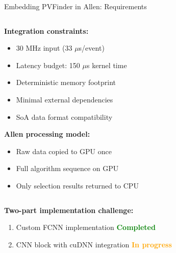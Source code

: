 \documentclass[10pt,aspectratio=169]{beamer}
\begin{document}
\begin{frame}{Embedding PVFinder in Allen: Requirements}
  \begin{columns}[T]
    \begin{column}{0.58\textwidth}
      \textbf{Integration constraints:}
      \begin{itemize}
        \item 30 MHz input (33 $\mu$s/event)
        \item Latency budget: 150 $\mu$s kernel time
        \item Deterministic memory footprint
        \item Minimal external dependencies
        \item SoA data format compatibility
      \end{itemize}
      
      \textbf{Allen processing model:}
      \begin{itemize}
        \item Raw data copied to GPU once
        \item Full algorithm sequence on GPU
        \item Only selection results returned to CPU
      \end{itemize}
    \end{column}

    \begin{column}{0.42\textwidth}
      \begin{center}
      \end{center}
    \end{column}
  \end{columns}

  \vspace{-0.1cm}
  \textbf{Two-part implementation challenge:}
  \begin{enumerate}
    \item Custom FCNN implementation \textcolor{green}{\textbf{Completed}}
    \item CNN block with cuDNN integration \textcolor{orange}{\textbf{In progress}}
  \end{enumerate}
\end{frame}
\end{document}
